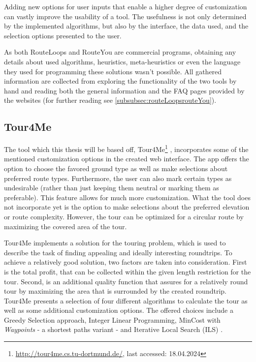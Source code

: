 Adding new options for user inputs that enable a higher degree of customization can vastly improve the usability of a tool. 
The usefulness is not only determined by the implemented algorithms, but also by the interface, the data used, and the selection options presented to the user. 

As both RouteLoops and RouteYou are commercial programs, obtaining any details about used algorithms, heuristics, meta-heuristics or even the language they used for programming these solutions wasn't possible.
All gathered information are collected from exploring the functionality of the two tools by hand and reading both the general information and the FAQ pages provided by the websites (for further reading see \ref{subsubsec:routeLoopsrouteYou}). 

\subsection{Tour4Me}
\label{subsec:Tour4Me}

The tool which this thesis will be based off, Tour4Me\footnote{\url{http://tour4me.cs.tu-dortmund.de/}, last accessed: 18.04.2024} \cite{buchin_tour4me_2022}, incorporates some of the mentioned customization options in the created web interface. 
The app offers the option to choose the favored ground type as well as make selections about preferred route types.
Furthermore, the user can also mark certain types as undesirable (rather than just keeping them neutral or marking them as preferable).
This feature allows for much more customization.
What the tool does not incorporate yet is the option to make selections about the preferred elevation or route complexity.
However, the tour can be optimized for a circular route by maximizing the covered area of the tour. 

Tour4Me implements a solution for the \glqq touring problem\grqq , which is used to describe the task of finding appealing and ideally interesting roundtrips.
To achieve a relatively good solution, two factors are taken into consideration.
First is the total profit, that can be collected within the given length restriction for the tour.
Second, is an additional quality function that assures for a relatively round tour by maximizing the area that is surrounded by the created roundtrip.
Tour4Me presents a selection of four different algorithms to calculate the tour as well as some additional customization options.
The offered choices include a Greedy Selection approach, Integer Linear Programming, MinCost with \textit{Waypoints} - a shortest paths variant - and Iterative Local Search (ILS) \cite{buchin_tour4me_2022}. 

